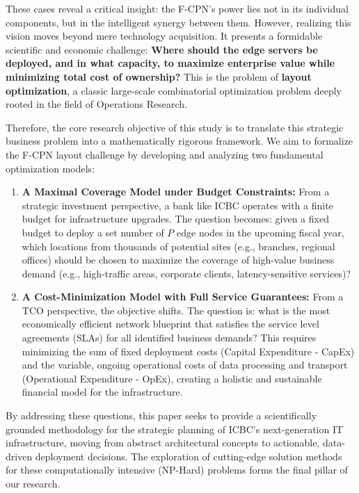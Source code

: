 \documentclass[11pt,a4paper]{article}
\begin{document}
These cases reveal a critical insight: the F-CPN's power lies not in its individual components, but in the intelligent synergy between them. However, realizing this vision moves beyond mere technology acquisition. It presents a formidable scientific and economic challenge: \textbf{Where should the edge servers be deployed, and in what capacity, to maximize enterprise value while minimizing total cost of ownership?} This is the problem of \textbf{layout optimization}, a classic large-scale combinatorial optimization problem deeply rooted in the field of Operations Research.

Therefore, the core research objective of this study is to translate this strategic business problem into a mathematically rigorous framework. We aim to formalize the F-CPN layout challenge by developing and analyzing two fundamental optimization models:

\begin{enumerate}
  \item \textbf{A Maximal Coverage Model under Budget Constraints:} From a strategic investment perspective, a bank like ICBC operates with a finite budget for infrastructure upgrades. The question becomes: given a fixed budget to deploy a set number of $P$ edge nodes in the upcoming fiscal year, which locations from thousands of potential sites (e.g., branches, regional offices) should be chosen to maximize the coverage of high-value business demand (e.g., high-traffic areas, corporate clients, latency-sensitive services)?
  \item \textbf{A Cost-Minimization Model with Full Service Guarantees:} From a TCO perspective, the objective shifts. The question is: what is the most economically efficient network blueprint that satisfies the service level agreements (SLAs) for all identified business demands? This requires minimizing the sum of fixed deployment costs (Capital Expenditure - CapEx) and the variable, ongoing operational costs of data processing and transport (Operational Expenditure - OpEx), creating a holistic and sustainable financial model for the infrastructure.
\end{enumerate}

By addressing these questions, this paper seeks to provide a scientifically grounded methodology for the strategic planning of ICBC's next-generation IT infrastructure, moving from abstract architectural concepts to actionable, data-driven deployment decisions. The exploration of cutting-edge solution methods for these computationally intensive (NP-Hard) problems forms the final pillar of our research.
\end{document}
